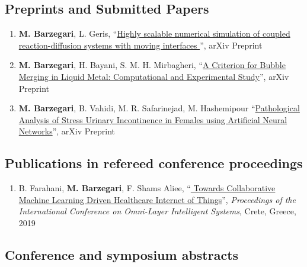\documentclass{cv}
\begin{document}
\subsection{Preprints and Submitted Papers}
\begin{enumerate}
\item
\textbf{M. Barzegari}, L. Geris, ``\href{https://arxiv.org/abs/2008.11057}{Highly scalable numerical simulation of coupled reaction-diffusion systems with moving interfaces
}'', arXiv Preprint
\item
\textbf{M. Barzegari}, H. Bayani, S. M. H. Mirbagheri, ``\href{https://arxiv.org/abs/1708.01608}{A Criterion for Bubble Merging in Liquid Metal: Computational and Experimental Study}'', arXiv Preprint
\item
\textbf{M. Barzegari}, B. Vahidi, M. R. Safarinejad, M. Hashemipour ``\href{https://arxiv.org/abs/1803.01843}{Pathological Analysis of Stress Urinary Incontinence in Females using Artificial Neural Networks}'', arXiv Preprint
\end{enumerate}

\subsection{Publications in refereed conference proceedings}
\begin{enumerate}
\item
B. Farahani, \textbf{M. Barzegari}, F. Shams Aliee, ``\href{https://dl.acm.org/citation.cfm?id=3312644}{
Towards Collaborative Machine Learning Driven Healthcare Internet of Things}'', \textit{Proceedings of the International Conference on Omni-Layer Intelligent Systems}, Crete, Greece, 2019 
\end{enumerate}

\subsection{Conference and symposium abstracts}
\end{document}
